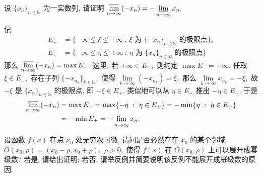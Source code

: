 
\begin{question}[points = 8]
设 $\{ x_n \}_{n \in \mathbb{N}}$ 为一实数列, 请证明 $\varlimsup\limits_{n\to\infty} (-x_n) = - \varliminf\limits_{n\to\infty} x_n.$

\end{question}

\begin{solution}

记
\begin{align*}
E_- & = \{ -\infty \leqslant \xi \leqslant +\infty ~:~ \text{$\xi$ 为 $\{ -x_n \}_{n \in \mathbb{N}}$ 的极限点} \}, \\
E_+ & = \{ -\infty \leqslant \eta \leqslant +\infty ~:~ \text{$\eta$ 为 $\{ x_n \}_{n \in \mathbb{N}}$ 的极限点} \}
\end{align*}
那么 $\varlimsup\limits_{n\to\infty} (-x_n) = \max E_-.$ 这里, 若 $+\infty \in E_-,$ 则约定 $\max E_- = +\infty.$ 任取 $\xi \in E_-,$ 存在子列 $\{ -x_{n_k} \}_{k \in \mathbb{N}},$ 使得 $\lim\limits_{k\to\infty} (-x_{n_k}) = \xi,$ 那么 $\lim\limits_{k\to\infty} x_{n_k} = -\xi,$ 故 $-\xi$ 是 $\{ x_n \}_{n \in \mathbb{N}}$ 的极限点, 即 $-\xi \in E_+.$ 类似地可以从 $\eta \in E_+$ 推出 $-\eta \in E_-.$ 于是
\begin{align*}
\varlimsup\limits_{n\to\infty} (-x_n) & = \max E_- = \max \{ -\eta ~:~ \eta \in E_+\} = - \min \{ \eta ~:~ \eta \in E_+\} \\
& = - \min E_+ = - \varliminf\limits_{n\to\infty} x_n.
\end{align*}
\end{solution}


\begin{question}[points = 10]
设函数 $f(x)$ 在点 $x_0$ 处无穷次可微, 请问是否必然存在 $x_0$ 的某个邻域 $O(x_0, \rho) = (x_0 - \rho, x_0 + \rho),$ $\rho > 0,$ 使得 $f(x)$ 在 $O(x_0, \rho)$ 上可以展开成幂级数? 若是, 请给出证明; 若否, 请举反例并简要说明该反例不能展开成幂级数的原因.

\end{question}

